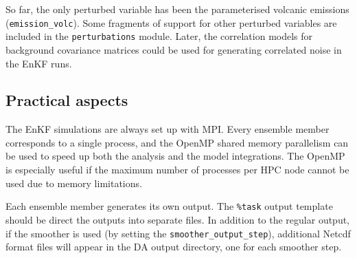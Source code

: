 \documentclass[a4paper]{article}
\begin{document}
So far, the only perturbed variable has been the parameterised volcanic emissions
(\verb|emission_volc|). Some fragments of support for other perturbed variables are
included in the \verb|perturbations| module. Later, the correlation models for background
covariance matrices could be used for generating correlated noise in the EnKF runs.

\subsection{Practical aspects}

The EnKF simulations are always set up with MPI. Every ensemble member corresponds to a
single process, and the OpenMP shared memory parallelism can be used to speed up both
the analysis and the model integrations. The OpenMP is especially useful if the maximum
number of processes per HPC node cannot be used due to memory limitations.

Each ensemble member generates its own output. The \verb|%task| output template should be
direct the outputs into separate files. In addition to the regular output, if the smoother
is used (by setting the \verb|smoother_output_step|), additional Netcdf format files will
appear in the DA output directory, one for each smoother step.








{}
\end{document}
